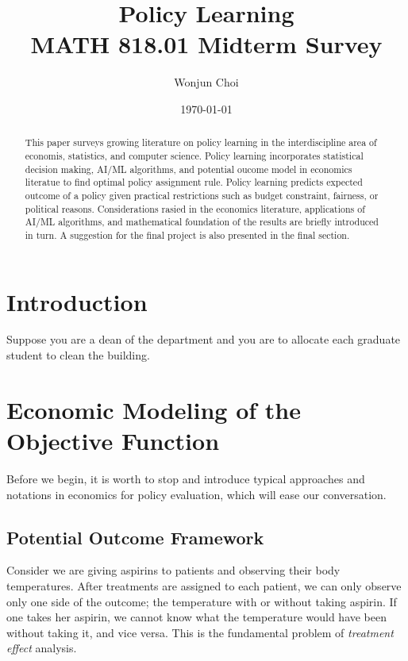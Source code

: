 \documentclass[11pt]{article}
\title{Policy Learning\\
	\large MATH 818.01 Midterm Survey
}
\author{Wonjun Choi}
\date{\today}
\newtheorem{theorem}{Theorem}
\newcommand{\rr}{\mathbb{R}}
\begin{document}
	
	\maketitle
	
	\begin{abstract}
This paper surveys growing literature on policy learning in the interdiscipline area of economis, statistics, and computer science. Policy learning incorporates statistical decision making, AI/ML algorithms, and potential oucome model in economics literatue to find optimal policy assignment rule. Policy learning predicts expected outcome of a policy given practical restrictions such as budget constraint, fairness, or political reasons. Considerations rasied in the economics literature, applications of AI/ML algorithms, and mathematical foundation of the results are briefly introduced in turn. A suggestion for the final project is also presented in the final section.
	\end{abstract}
	
	\section{Introduction}\label{section-introduction}
Suppose you are a dean of the department and you are to allocate each graduate student to clean the building.
	
	
	\section{Economic Modeling of the Objective Function}
	Before we begin, it is worth to stop and introduce typical approaches and notations in economics for policy evaluation, which will ease our conversation.
	
	\subsection*{Potential Outcome Framework}
	Consider we are giving aspirins to patients and observing their body temperatures. After treatments are assigned to each patient, we can only observe only one side of the outcome; the temperature with or without taking aspirin. If one takes her aspirin, we cannot know what the temperature would have been without taking it, and vice versa. This is the fundamental problem of \textit{treatment effect} analysis.
	
\end{document}
